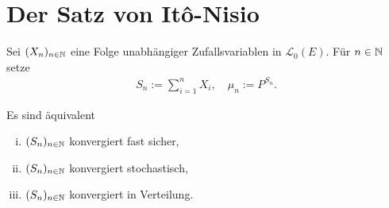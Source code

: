 \section{Der Satz von Itô-Nisio}
    Sei $(X_n)_{n \in \mathbb{N}}$ eine Folge unabhängiger Zufallsvariablen in $\mathcal{L}_0(E)$. Für $n \in \mathbb{N}$ setze
    \begin{align*}
    S_n := \sum_{i=1}^n X_i, 
    \quad 
    \mu_n := P^{S_n} .
    \end{align*}
\begin{theorem}
    Es sind äquivalent
    \begin{enumerate}[(i)]
        \item $(S_n)_{n \in \mathbb{N}}$ konvergiert fast sicher, 
        \item $(S_n)_{n \in \mathbb{N}}$ konvergiert stochastisch, 
        \item $(S_n)_{n \in \mathbb{N}}$ konvergiert in Verteilung. 
    \end{enumerate}
\end{theorem}

